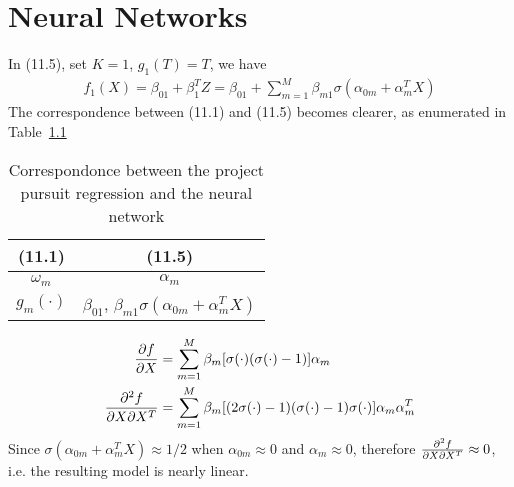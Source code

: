 \chapter{Neural Networks}
\label{ch:11}

\begin{exercise}
  In (11.5), set $K=1$, $g_1(T)=T$, we have
  \begin{align}
    f_1(X) = \beta_{01} + \beta_1^TZ = \beta_{01} +
    \sum_{m=1}^M\beta_{m1}\sigma(\alpha_{0m} + \alpha_m^TX)
  \end{align}
  The correspondence between (11.1) and (11.5) becomes clearer, as
  enumerated in Table~\ref{tab:ch11_1_correspondonce}
  
  \begin{table}[htb]
    \caption{Correspondonce between the project pursuit regression and the
    neural network}
    \label{tab:ch11_1_correspondonce}
    \centering
    \begin{tabular}{c|c}
      \hline
      (11.1) & (11.5) \\
      \hline
      $\omega_m$ & $\alpha_m$ \\
      $g_m(\cdot)$ & $\beta_{01}$, $\beta_{m1}\sigma(\alpha_{0m} +
        \alpha_m^TX)$\\
      \hline
    \end{tabular}
  \end{table}
\end{exercise}

\begin{exercise}
  \begin{align}
    \pdv{f}{X} & = \sum_{m=1}^M\beta_m[\sigma(\cdot)(\sigma(\cdot) -
    1)]\alpha_m \\
    \pdv{f}{X}{X^T} &= \sum_{m=1}^M\beta_m[(2\sigma(\cdot)-1)(\sigma(\cdot) -
    1)\sigma(\cdot)]\alpha_m\alpha_m^T
  \end{align}
  Since $\sigma(\alpha_{0m} + \alpha_m^TX)\approx 1/2$ when $\alpha_{0m}\approx
  0$ and $\alpha_{m}\approx 0$, therefore $\pdv{f}{X}{X^T}\approx 0$, i.e. the
  resulting model is nearly linear.
\end{exercise}

